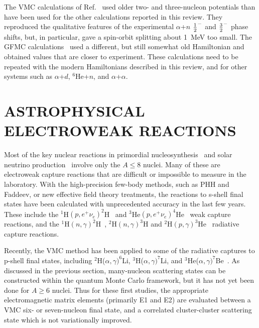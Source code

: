 The VMC calculations of Ref.~\cite{csk87} used older two- and three-nucleon
potentials than have been used for the other calculations reported
in this review.  They reproduced the qualitative features of the 
experimental $\alpha$+$n$ $\textstyle{1\over2}^-$ and $\textstyle{3\over2}^-$ phase shifts,
but, in particular, gave a spin-orbit splitting about 1~MeV too small.
The GFMC calculations~\cite{cs94} used a different, but still somewhat old
Hamiltonian and obtained values that are closer to experiment.  These
calculations need to be repeated with the modern Hamiltonians
described in this review, and for other systems such as $\alpha$+$d$,
$^6$He+$n$, and  $\alpha$+$\alpha$.

\section{ASTROPHYSICAL ELECTROWEAK REACTIONS}

Most of the key nuclear reactions in primordial nucleosynthesis~\cite{NB00}
and solar neutrino production~\cite{A+98} involve only the $A \leq 8$ nuclei.
Many of these are electroweak capture reactions that are difficult or
impossible to measure in the laboratory.
With the high-precision few-body methods, such as PHH and Faddeev, or new 
effective field theory treatments, the reactions to s-shell final states
have been calculated with unprecedented accuracy in the last few years.
These include the $^1$H$(p,e^+\nu_e)^2$H~\cite{SS+98} and 
$^3$He$(p,e^+\nu_e)^4$He~\cite{MSVKR00} weak capture reactions, and the
$^1$H$(n,\gamma)^2$H~\cite{R00}, $^2$H$(n,\gamma)^3$H and 
$^2$H$(p,\gamma)^3$He~\cite{VSK96} radiative capture reactions.

Recently, the VMC method has been applied to some of the radiative captures 
to p-shell final states, including $^2$H($\alpha,\gamma)^6$Li,
$^3$H($\alpha,\gamma)^7$Li, and $^3$He($\alpha,\gamma)^7$Be~\cite{NWS01,N01}.
As discussed in the previous section, many-nucleon scattering states can be
constructed within the quantum Monte Carlo framework, but it
has not yet been done for $A \geq 6$ nuclei.
Thus for these first studies, the appropriate electromagnetic
matrix elements (primarily E1 and E2) are evaluated between a VMC six- or
seven-nucleon final state, and a correlated cluster-cluster scattering 
state which is not variationally improved.

